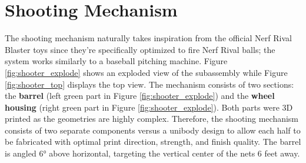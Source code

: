 \section{Shooting Mechanism}
The shooting mechanism naturally takes inspiration from the official Nerf Rival Blaster toys since they're specifically optimized to fire Nerf Rival balls; the system works similarly to a baseball pitching machine. Figure \ref{fig:shooter_explode} shows an exploded view of the subassembly while Figure \ref{fig:shooter_top} displays the top view. The mechanism consists of two sections: the \textbf{barrel} (left green part in Figure \ref{fig:shooter_explode}) and the \textbf{wheel housing} (right green part in Figure \ref{fig:shooter_explode}). Both parts were 3D printed as the geometries are highly complex. Therefore, the shooting mechanism consists of two separate components versus a unibody design to allow each half to be fabricated with optimal print direction, strength, and finish quality. The barrel is angled \ang{6} above horizontal, targeting the vertical center of the nets 6 feet away.

